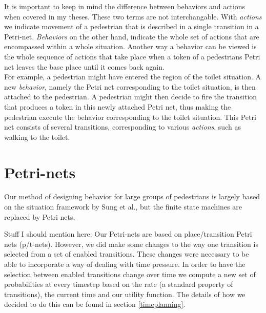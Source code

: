 \documentclass[11pt]{book}
\begin{document}
It is important to keep in mind the difference between behaviors and actions when covered in my theses. These two terms are not interchangable. With \emph{actions} we indicate movement of a pedestrian that is described in a single transition in a Petri-net. \emph{Behaviors} on the other hand, indicate the whole set of actions that are encompassed within a whole situation. Another way a behavior can be viewed is the whole sequence of actions that take place when a token of a pedestrians Petri net leaves the base place until it comes back again. \\
For example, a pedestrian might have entered the region of the toilet situation. A new \emph{behavior}, namely the Petri net corresponding to the toilet situation, is then attached to the pedestrian. A pedestrian might then decide to fire the transition that produces a token in this newly attached Petri net, thus making the pedestrian execute the behavior corresponding to the toilet situation. This Petri net consists of several transitions, corresponding to various \emph{actions}, such as walking to the toilet.


\section{Petri-nets}
Our method of designing behavior for large groups of pedestrians is largely based on the situation framework by Sung et al., but the finite state machines are replaced by Petri nets.

Stuff I should mention here:
Our Petri-nets are based on place/transition Petri nets (p/t-nets). However, we did make some changes to the way one transition is selected from a set of enabled transitions. These changes were necessary to be able to incorporate a way of dealing with time pressure. In order to have the selection between enabled transitions change over time we compute a new set of probabilities at every timestep based on the rate (a standard property of transitions), the current time and our utility function. The details of how we decided to do this can be found in section \ref{timeplanning}.
\end{document}
